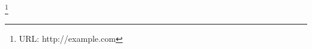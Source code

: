 \documentclass{ifacconf}
\begin{document}
\thanks[author-url-mylabel]{URL: http://example.com}
\end{document}
